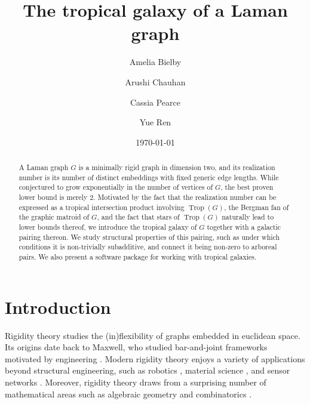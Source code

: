 \documentclass[11pt,reqno,a4paper]{amsart}
\title{The tropical galaxy of a Laman graph}
\author{Amelia Bielby}
\author{Arushi Chauhan}
\author{Cassia Pearce}
\author{Yue Ren}
\date{\today}
\theoremstyle{theoremstyle}
\theoremstyle{examplestyle}
\theoremstyle{algorithmstyle}
\newcommand{\FF}{\mathbb{F}}
\newcommand{\GG}{\mathbb{G}}
\newcommand{\HH}{\mathbb{H}}
\DeclareMathOperator{\Trop}{Trop}
\begin{document}
\begin{abstract}
A Laman graph $G$ is a minimally rigid graph in dimension two, and its realization number is its number of distinct embeddings with fixed generic edge lengths. While conjectured to grow exponentially in the number of vertices of $G$, the best proven lower bound is merely $2$. Motivated by the fact that the realization number can be expressed as a tropical intersection product involving $\Trop(G)$, the Bergman fan of the graphic matroid of $G$, and the fact that stars of $\Trop(G)$ naturally lead to lower bounds thereof, we introduce the tropical galaxy of $G$ together with a galactic pairing thereon. We study structural properties of this pairing, such as under which conditions it is non-trivially subadditive, and connect it being non-zero to arboreal pairs.  We also present a software package for working with tropical galaxies.
\end{abstract}

\maketitle



\section{Introduction}
Rigidity theory studies the (in)flexibility of graphs embedded in euclidean space.  Its origins date back to Maxwell, who studied bar-and-joint frameworks motivated by engineering \cite{Maxwell1870}.  Modern rigidity theory enjoys a variety of applications beyond structural engineering, such as robotics \cite{ZelazoFranchiAllgowerBulthoffGiordano2012}, material science \cite{RaderBrown2011}, and sensor networks \cite{SoYe2007}. Moreover, rigidity theory draws from a surprising number of mathematical areas such as algebraic geometry and combinatorics \cite{SitharamJohnSidman2018}.
\end{document}
